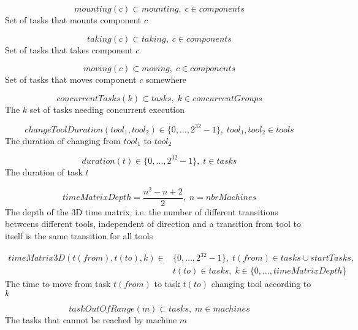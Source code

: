 \documentclass[10pt,a4paper]{report}
\begin{document}
\begin{equation}\label{eq:36}
mounting(c) \subset mounting, \; c \in components\end{equation}
Set of tasks that mounts component $c$

\begin{equation}\label{eq:37}
taking(c) \subset taking, \; c \in components\end{equation}
Set of tasks that takes component $c$

\begin{equation}\label{eq:38}
moving(c) \subset moving, \; c \in components\end{equation}
Set of tasks that moves component $c$ somewhere

\begin{equation}\label{eq:30}
concurrentTasks(k) \subset tasks, \; k \in concurrentGroups\end{equation}
The $k$ set of tasks needing concurrent execution

\begin{equation}\label{eq:34}
changeToolDuration(tool_1,tool_2) \in \{0 , \ldots , 2^{32}-1\}, \; tool_1,tool_2 \in tools
\end{equation} 
The duration of changing from $tool_1$ to $tool_2$

\begin{equation}\label{eq:42}
duration(t) \in \{0 , \ldots , 2^{32}-1\}, \; t \in tasks\end{equation}
The duration of task $t$

\begin{equation}\label{eq:43}
timeMatrixDepth = \frac{n^2 - n + 2}{2}, \; n = nbrMachines\end{equation}
The depth of the 3D time matrix, i.e. the number of different transitions betweens different tools, independent of direction and a transition from tool to itself is the same transition for all tools

\begin{equation}
\begin{aligned}\label{eq:44}
timeMatrix3D(t(from),t(to),k) \in &\{0 , \ldots , 2^{32}-1\}, \; t(from) \in tasks \cup startTasks,  \\ 
&t(to) \in tasks, \; k \in \{0 , \ldots , timeMatrixDepth\}
\end{aligned}
\end{equation}
The time to move from task $t(from)$ to task $t(to)$ changing tool according to $k$

\begin{equation}\label{eq:56}
taskOutOfRange(m) \subset tasks, \; m \in machines\end{equation}
The tasks that cannot be reached by machine $m$
\end{document}
